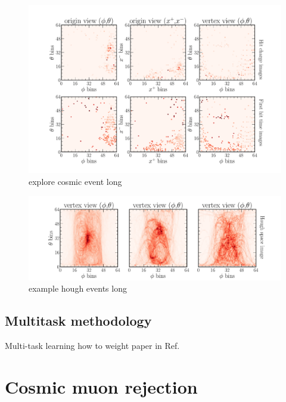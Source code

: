 \begin{figure} %
    \includegraphics[width=\textwidth]{diagrams/7-cvn/chipsnet/explore_cosmic_event.pdf}
    \caption[explore cosmic event short]
    {explore cosmic event long}
    \label{fig:explore_cosmic_event}
\end{figure}

\begin{figure} %
    \includegraphics[width=\textwidth]{diagrams/7-cvn/chipsnet/explore_hough_events.pdf}
    \caption[example hough events short]
    {example hough events long}
    \label{fig:example_hough_events}
\end{figure}

\subsection{Multitask methodology} %
\label{sec:cvn_baseline_multi} %

Multi-task learning how to weight paper in Ref.~\cite{kendall2017}

\section{Cosmic muon rejection} %
\label{sec:cvn_cosmic} %

